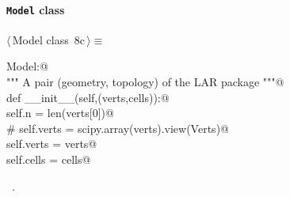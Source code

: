\documentclass[11pt,oneside]{article}	%
\begin{document}
\paragraph{\texttt{Model} class}
\begin{flushleft} \small \label{scrap23}
\protect{}$\langle\,$Model class\nobreak\ {\footnotesize 8c}$\,\rangle\equiv$
\vspace{-1ex}
\begin{list}{}{} \item
\mbox{}\verb@class Model:@\\
\mbox{}\verb@   """ A pair (geometry, topology) of the LAR package """@\\
\mbox{}\verb@   def __init__(self,(verts,cells)):@\\
\mbox{}\verb@      self.n = len(verts[0])@\\
\mbox{}\verb@      # self.verts = scipy.array(verts).view(Verts)@\\
\mbox{}\verb@      self.verts = verts@\\
\mbox{}\verb@      self.cells = cells@\\
\mbox{}\verb@@{\NWsep}
\end{list}
\vspace{-1ex}
\footnotesize\addtolength{\baselineskip}{-1ex}
\begin{list}{}{\setlength{\itemsep}{-\parsep}\setlength{\itemindent}{-\leftmargin}}
\item \NWtxtMacroRefIn\ .
\end{list}
\end{flushleft}
\end{document}
